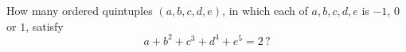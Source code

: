 How many ordered quintuples $(a,b,c,d,e)$, in which each of $a,b,c,d,e$ is $-1$, $0$ or $1$, satisfy
\[a+b^2+c^3+d^4+e^5=2\,?\]
